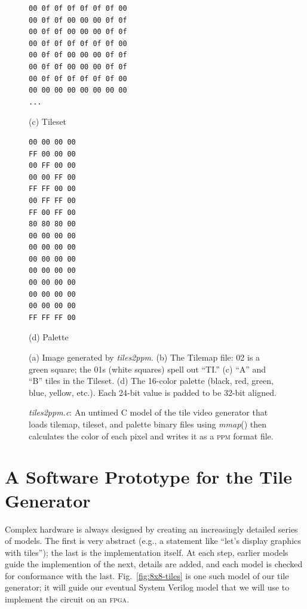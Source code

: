 \documentclass[11pt]{article}
\newcommand{\figref}[1]{Fig.~\ref{fig:#1}}
\begin{document}
\begin{figure}
\begin{minipage}[b]{0.22\textwidth}
{\begin{verbatim}
00 0f 0f 0f 0f 0f 0f 00
00 0f 0f 00 00 00 0f 0f
00 0f 0f 00 00 00 0f 0f
00 0f 0f 0f 0f 0f 0f 00
00 0f 0f 00 00 00 0f 0f
00 0f 0f 00 00 00 0f 0f
00 0f 0f 0f 0f 0f 0f 00
00 00 00 00 00 00 00 00
...
\end{verbatim}
}
  \vspace{-1.25\baselineskip}
\centerline{(c) Tileset}
  \end{minipage}\hfill
  \begin{minipage}[b]{0.1\textwidth}  
  {\datasize
\begin{verbatim}
00 00 00 00
FF 00 00 00
00 FF 00 00
00 00 FF 00
FF FF 00 00
00 FF FF 00
FF 00 FF 00
80 80 80 00
00 00 00 00
00 00 00 00
00 00 00 00
00 00 00 00
00 00 00 00
00 00 00 00
00 00 00 00
FF FF FF 00
\end{verbatim}
  }
  \vspace{-0.5\baselineskip}
  \centerline{(d) Palette}
  \end{minipage}

  \caption{(a) Image generated by \emph{tiles2ppm}.  (b) The Tilemap
    file: 02 is a green square; the 01s (white squares) spell out
    ``TI.''  (c) ``A'' and ``B'' tiles in the Tileset.  (d) The
    16-color palette (black, red, green, blue, yellow, etc.).  Each 24-bit value is padded to be 32-bit aligned.}
  \label{fig:tile-output}
\end{figure}

\begin{figure}
  
  \caption{\emph{tiles2ppm.c}:
    An untimed C model of the tile video generator that loads
    tilemap, tileset, and palette binary files using
    \emph{mmap}() then calculates the color of each pixel
    and writes it as a \textsc{ppm} format file.}
\label{fig:tile-sw}
\end{figure}

\section{A Software Prototype for the Tile Generator}

Complex hardware is always designed by creating an increasingly
detailed series of models.  The first is very abstract (e.g., a
statement like ``let's display graphics with tiles''); the last is the
implementation itself.  At each step, earlier models guide the
implemention of the next, details are added, and each model is checked
for conformance with the last.  \figref{8x8-tiles} is one such model
of our tile generator; it will guide our eventual System Verilog model
that we will use to implement the circuit on an \textsc{fpga}.
\end{document}
